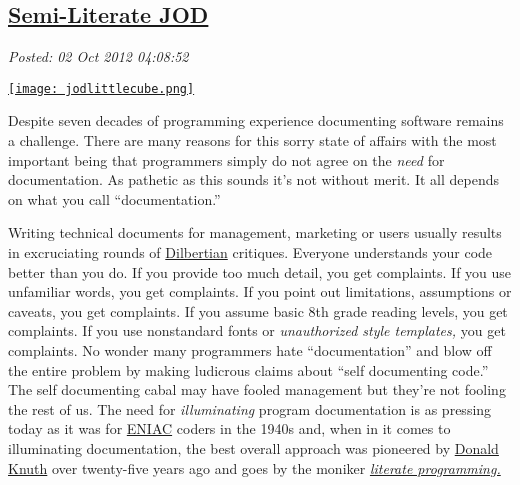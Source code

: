 %

\subsection*{\href{https://bakerjd99.wordpress.com/2012/10/01/semi-literate-jod/}{Semi-Literate JOD}}


\noindent\emph{Posted: 02 Oct 2012 04:08:52}
\vspace{6pt}



\captionsetup[floatingfigure]{labelformat=empty}
\begin{floatingfigure}[r]{0.14\textwidth}
\centering
\href{https://analyzethedatanotthedrivel.org/the-jod-page/}{\texttt{[image: jodlittlecube.png]}}
\label{fig:3303X0}
\end{floatingfigure} Despite seven decades of programming experience documenting software
remains a challenge. There are many reasons for this sorry state of
affairs with the most important being that programmers simply do not
agree on the \emph{need} for documentation. As pathetic as this sounds
it's not without merit. It all depends on what you call
``documentation.''

Writing technical documents for management, marketing or users usually
results in excruciating rounds of
\href{http://search.dilbert.com/comic/Documentation}{Dilbertian}
critiques. Everyone understands your code better than you do. If you
provide too much detail, you get complaints. If you use unfamiliar
words, you get complaints. If you point out limitations, assumptions or
caveats, you get complaints. If you assume basic 8th grade reading
levels, you get complaints. If you use nonstandard fonts or
\emph{unauthorized style templates,} you get complaints. No wonder many
programmers hate ``documentation'' and blow off the entire problem by
making ludicrous claims about ``self documenting code.'' The self
documenting cabal may have fooled management but they're not fooling the
rest of us. The need for \emph{illuminating} program documentation is as
pressing today as it was for
\href{http://inventors.about.com/od/estartinventions/a/Eniac.htm}{ENIAC}
coders in the 1940s and, when in it comes to illuminating documentation,
the best overall approach was pioneered by
\href{http://www-cs-faculty.stanford.edu/~uno/}{Donald Knuth} over
twenty-five years ago and goes by the moniker
\href{http://en.wikipedia.org/wiki/Literate\_programming}{\emph{literate
programming.}}

